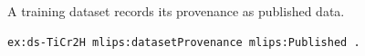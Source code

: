 A training dataset records its provenance as published data.
\begin{lstlisting}[language=turtle]
ex:ds-TiCr2H mlips:datasetProvenance mlips:Published .
\end{lstlisting}
